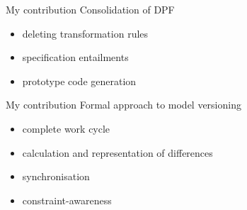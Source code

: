 \documentclass[dvips,slidetop,mathserif,brown]{beamer}
\begin{document}
\begin{frame}{My contribution}
  Consolidation of DPF
  \begin{itemize}
    \item deleting transformation rules
    \item specification entailments
    \item prototype code generation
  \end{itemize}
\end{frame}

\begin{frame}{My contribution}
  Formal approach to model versioning
  \begin{itemize}
    \item complete work cycle
    \item calculation and representation of differences
    \item synchronisation
    \item constraint-awareness
  \end{itemize}
\end{frame}



\end{document}
